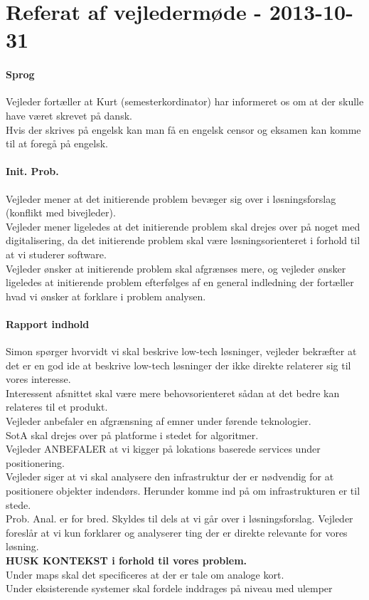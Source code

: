 \documentclass[article,11pt]{memoir}
\begin{document}
\section{Referat af vejledermøde - 2013-10-31}
\paragraph{Sprog}
Vejleder fortæller at Kurt (semesterkordinator) har informeret os om at der skulle have været skrevet på dansk. \\
Hvis der skrives på engelsk kan man få en engelsk censor og eksamen kan komme til at foregå på engelsk.
\paragraph{Init. Prob.}
Vejleder mener at det initierende problem bevæger sig over i løsningsforslag (konflikt med bivejleder). \\
Vejleder mener ligeledes at det initierende problem skal drejes over på noget med digitalisering, da det initierende problem skal være løsningsorienteret i forhold til at vi studerer software. \\
Vejleder ønsker at initierende problem skal afgrænses mere, og vejleder ønsker ligeledes at initierende problem efterfølges af en general indledning der fortæller hvad vi ønsker at forklare i problem analysen.\\
\paragraph{Rapport indhold}
Simon spørger hvorvidt vi skal beskrive low-tech løsninger, vejleder bekræfter at det er en god ide at beskrive low-tech løsninger der ikke direkte relaterer sig til vores interesse.\\
Interessent afsnittet skal være mere behovsorienteret sådan at det bedre kan relateres til et produkt.\\
Vejleder anbefaler en afgrænsning af emner under førende teknologier.\\
SotA skal drejes over på platforme i stedet for algoritmer.\\
Vejleder ANBEFALER at vi kigger på lokations baserede services under positionering.\\
Vejleder siger at vi skal analysere den infrastruktur der er nødvendig for at positionere objekter indendørs. Herunder komme ind på om infrastrukturen er til stede.\\
Prob. Anal. er for bred. Skyldes til dels at vi går over i løsningsforslag. Vejleder foreslår at vi kun forklarer og analyserer ting der er direkte relevante for vores løsning.\\
\textbf{HUSK KONTEKST i forhold til vores problem.}\\
Under maps skal det specificeres at der er tale om analoge kort.\\
Under eksisterende systemer skal fordele inddrages på niveau med ulemper\\
\end{document}
